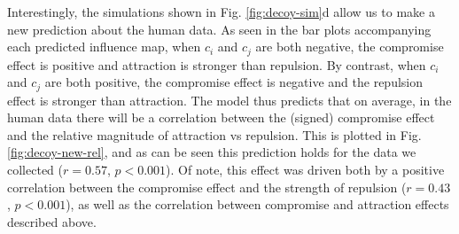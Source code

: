 \documentclass[a4paper, nobind]{templates/ociamthesis}
\begin{document}
\begin{table}

\caption{\label{tab:decoy-table}Parameters for map simulation.}
\centering
{}
\end{table}

Interestingly, the simulations shown in Fig. \ref{fig:decoy-sim}d allow us to make a new prediction about the human data. As seen in the bar plots accompanying each predicted influence map, when \(c_i\) and \(c_j\) are both negative, the compromise effect is positive and attraction is stronger than repulsion. By contrast, when \(c_i\) and \(c_j\) are both positive, the compromise effect is negative and the repulsion effect is stronger than attraction. The model thus predicts that on average, in the human data there will be a correlation between the (signed) compromise effect and the relative magnitude of attraction vs repulsion. This is plotted in Fig. \ref{fig:decoy-new-rel}, and as can be seen this prediction holds for the data we collected (\(r=0.57\), \(p<0.001\)). Of note, this effect was driven both by a positive correlation between the compromise effect and the strength of repulsion (\(r=0.43\), \(p<0.001\)), as well as the correlation between compromise and attraction effects described above.
\end{document}
